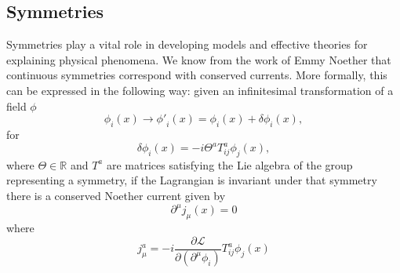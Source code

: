 \documentclass[aps,prd,onecolumn,showpacs,amsmath,amssymb,nofootinbib]{revtex4} \pdfoutput=1
\begin{document}
\subsection{Symmetries}

Symmetries play a vital role in developing models and effective theories for explaining physical phenomena. We know from the work of Emmy Noether that continuous symmetries correspond with conserved currents. More formally, this can be expressed in the following way: given an infinitesimal transformation of a field $\phi$ 
\begin{equation}
    \label{noetherTransformation1}
    \phi_{i}(x) \rightarrow {\phi'}_{i}(x) = \phi_{i}(x) + \delta \phi_{i}(x),
\end{equation}
for
\begin{equation}
    \label{noetherTransformation2}
    \delta \phi_{i}(x) = -i \Theta^{a} T^{a}_{ij}\phi_{j}(x),
\end{equation}
where $\Theta \in \mathbb{R}$ and $T^{a}$ are matrices satisfying the Lie algebra of the group representing a symmetry, if the Lagrangian is invariant under that symmetry there is a conserved Noether current given by
\begin{equation}
    \label{noetherTheorem}
    \partial^\mu j_{\mu}(x) = 0
\end{equation}
where
\begin{equation}
    \label{noetherCurrent}
    j^{a}_{\mu} = -i \frac{\partial\mathcal{L}}{\partial\left(\partial^{\mu}\phi_{i}\right)}T^{a}_{ij}\phi_{j}(x)
\end{equation}
\end{document}
